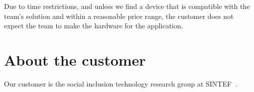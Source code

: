 Due to time restrictions, and unless we find a device that is compatible with the team's solution and within a reasonable price range, the customer does not expect the team to make the hardware for the application.

\section{About the customer}

Our customer is the social inclusion technology research group at SINTEF~\cite{sintef}.








 


